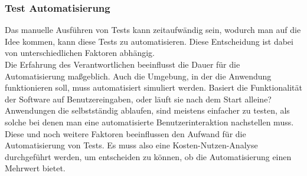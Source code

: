 \subsubsection{Test Automatisierung}
Das manuelle Ausführen von Tests kann zeitaufwändig sein, wodurch man auf die Idee kommen, kann diese Tests zu automatisieren. Diese Entscheidung ist dabei von unterschiedlichen Faktoren abhängig. \\
Die Erfahrung des Verantwortlichen beeinflusst die Dauer für die Automatisierung maßgeblich. Auch die Umgebung, in der die Anwendung funktionieren soll, muss automatisiert simuliert werden. Basiert die Funktionalität der Software auf Benutzereingaben, oder läuft sie nach dem Start alleine? Anwendungen die selbstständig ablaufen, sind meistens einfacher zu testen, als solche bei denen man eine automatisierte Benutzerinteraktion nachstellen muss\cite{fewster1999software}. \\
Diese und noch weitere Faktoren beeinflussen den Aufwand für die Automatisierung von Tests. Es muss also eine Kosten-Nutzen-Analyse durchgeführt werden, um entscheiden zu können, ob die Automatisierung einen Mehrwert bietet.
